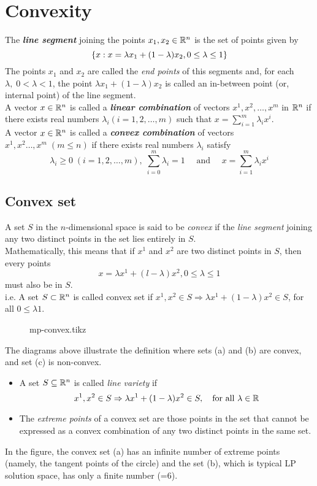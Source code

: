 \documentclass[../main-sheet.tex]{subfiles}
\begin{document}
\chapter{Convexity}
The \textbf{\emph{line segment}} joining the points \(x_1,x_2\in \mathbb{R}^n\) is the set of points given by
\[
    \left\{ x : x = \lambda x_1 + (1- \lambda ) x_2 , 0\leq \lambda \leq 1\right\}
\]
The points \(x_1\) and \(x_2\) are called the \emph{end points} of this segments and, for each \(\lambda,\;0<\lambda<1\), the point \(\lambda x_1+(1-\lambda)x_2\) is called an in-between point (or, internal point) of the line segment.\\


A vector \(x \in \mathbb{R}^n\) is called a \textbf{\emph{linear combination}} of vectors \(x^1,x^2,\dots,x^m\) in \(\mathbb{R}^n\) if there exists real numbers \(\lambda_i(i=1,2,\dots,m)\) such that \(x=\sum_{i=1}^m \lambda_i x^i\).\\


A vector \(x\in\mathbb{R}^n\) is called a \textbf{\emph{convex combination}} of vectors \(x^1,x^2\dots,x^m\; (m\leq n)\) if there exists real numbers \(\lambda_i\) satisfy 
\[
    \lambda_i\geq0\;(i=1,2,\dots,m),\;\sum_{i=0}^m\lambda_i =1 \quad\text{ and }\quad x=\sum_{i=1}^m\lambda_i x^i
\]
\section{Convex set}
A set \(S\) in the \(n\)-dimensional space is said to be \emph{convex} if the \emph{line segment} joining any two distinct points in the set lies entirely in \(S\).\\


Mathematically, this means that if \(x^1\) and \(x^2\) are two distinct points in \(S\), then every points 
\[x= \lambda x^1 + (l - \lambda )x^2, 0\leq \lambda\leq1 \]
must also be in \(S\).\\
i.e. A set \(S\subset \mathbb{R}^n\) is called convex set if \(x^1,x^2\in S\Rightarrow \lambda x^1+(1-\lambda)x^2 \in S\), for all \(0\leq \lambda 1\).
\begin{figure}[H]
    \centering
    {mp-convex.tikz}
\end{figure}
The diagrams above illustrate the definition where sets (a) and (b) are convex, and set (c) is non-convex.
\begin{itemize}
    \item A set \(S\subseteq \mathbb{R}^n\) is called \emph{line variety} if \[x^1,x^2\in S\Rightarrow\lambda x^1+(1-\lambda)x^2\in S, \quad\text{for all }\lambda \in \mathbb{R}\]
    \item The \emph{extreme points} of a convex set are those points in the set that cannot be expressed as a convex combination of any two distinct points in the same set.
\end{itemize}
In the figure, the convex set (a) has an infinite number of extreme points (namely, the tangent points of the circle) and the set (b), which is typical LP solution space, has only a finite number (=6).
\end{document}
